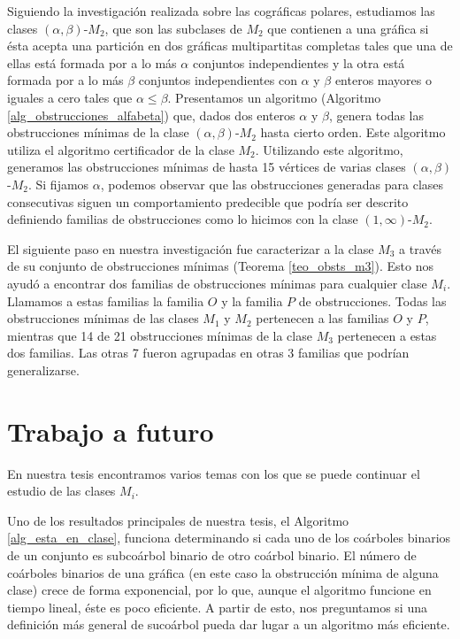 Siguiendo la investigación realizada sobre las cográficas polares, estudiamos las clases $(\alpha, \beta)$-$M_2$, que son las subclases de $M_2$ que contienen a una gráfica si ésta acepta una partición en dos gráficas multipartitas completas tales que una de ellas está formada por a lo más $\alpha$ conjuntos independientes y la otra está formada por a lo más $\beta$ conjuntos independientes con $\alpha$ y $\beta$ enteros mayores o iguales a cero tales que $\alpha \le \beta$. Presentamos un algoritmo (Algoritmo \ref{alg_obstrucciones_alfabeta}) que, dados dos enteros $\alpha$ y $\beta$, genera todas las obstrucciones mínimas de la clase $(\alpha, \beta)$-$M_2$ hasta cierto orden. Este algoritmo utiliza el algoritmo certificador de la clase $M_2$. Utilizando este algoritmo, generamos las obstrucciones mínimas de hasta 15 vértices de varias clases $(\alpha, \beta)$-$M_2$. Si fijamos $\alpha$, podemos observar que las obstrucciones generadas para clases consecutivas siguen un comportamiento predecible que podría ser descrito definiendo familias de obstrucciones como lo hicimos con la clase $(1,\infty)$-$M_2$.

El siguiente paso en nuestra investigación fue caracterizar a la clase $M_3$ a través de su conjunto de obstrucciones mínimas (Teorema \ref{teo_obsts_m3}). Esto nos ayudó a encontrar dos familias de obstrucciones mínimas para cualquier clase $M_i$. Llamamos a estas familias la familia $O$ y la familia $P$ de obstrucciones. Todas las obstrucciones mínimas de las clases $M_1$ y $M_2$ pertenecen a las familias $O$ y $P$, mientras que 14 de 21 obstrucciones mínimas de la clase $M_3$ pertenecen a estas dos familias. Las otras 7 fueron agrupadas en otras 3 familias que podrían generalizarse.

\section{Trabajo a futuro}

En nuestra tesis encontramos varios temas con los que se puede continuar el estudio de las clases $M_i$.

Uno de los resultados principales de nuestra tesis, el Algoritmo \ref{alg_esta_en_clase}, funciona determinando si cada uno de los coárboles binarios de un conjunto es subcoárbol binario de otro coárbol binario. El número de coárboles binarios de una gráfica (en este caso la obstrucción mínima de alguna clase) crece de forma exponencial, por lo que, aunque el algoritmo funcione en tiempo lineal, éste es poco eficiente. A partir de esto, nos preguntamos si una definición más general de sucoárbol pueda dar lugar a un algoritmo más eficiente.


